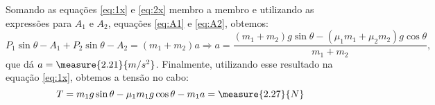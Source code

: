 \begin{question}
\begin{solution}
      Somando as equações \eqref{eq:1x} e \eqref{eq:2x} membro a membro e utilizando as expressões para $A_1$ e $A_2$, equações \eqref{eq:A1} e \eqref{eq:A2}, obtemos:
      \begin{equation*}
        P_1\sin\theta - A_1 + P_2\sin\theta - A_2 = (m_1 + m_2) a
        \Rightarrow
        a = \frac{(m_1 + m_2)g\sin\theta - (\mu_1 m_1 + \mu_2 m_2)g\cos\theta}{m_1+m_2},
      \end{equation*}
      que dá $a = \measure{2.21}{m/s^2}$.
      Finalmente, utilizando esse resultado na equação \eqref{eq:1x}, obtemos a tensão no cabo:
      \begin{equation*}
        T = m_1 g \sin\theta - \mu_1 m_1 g \cos\theta - m_1 a = \measure{2.27}{N}
      \end{equation*}
    \end{solution}
  \end{question}